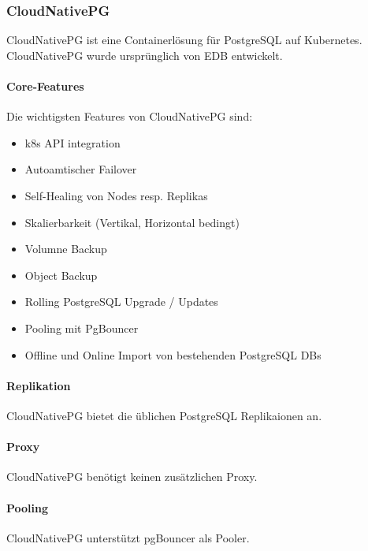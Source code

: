 
\begin{flushleft}
    \subsubsection{CloudNativePG}
    CloudNativePG ist eine Containerlösung für PostgreSQL auf Kubernetes.\\
    CloudNativePG wurde ursprünglich von EDB entwickelt.
\end{flushleft}
\begin{flushleft}
    \paragraph{Core-Features}
    Die wichtigsten Features von CloudNativePG sind\cite{5ALQPE2U}:
    \begin{itemize}
        \item k8s API integration
        \item Autoamtischer Failover
        \item Self-Healing von Nodes resp. Replikas
        \item Skalierbarkeit (Vertikal, Horizontal bedingt)
        \item Volumne Backup
        \item Object Backup
        \item Rolling PostgreSQL Upgrade / Updates
        \item Pooling mit PgBouncer
        \item Offline und Online Import von bestehenden PostgreSQL DBs
    \end{itemize}
\end{flushleft}
\begin{flushleft}
    \paragraph{Replikation}
    CloudNativePG bietet die üblichen PostgreSQL Replikaionen an.
\end{flushleft}
\begin{flushleft}
    \paragraph{Proxy}
    CloudNativePG benötigt keinen zusätzlichen Proxy.
\end{flushleft}
\begin{flushleft}
    \paragraph{Pooling}
    CloudNativePG unterstützt pgBouncer als Pooler.
\end{flushleft}
